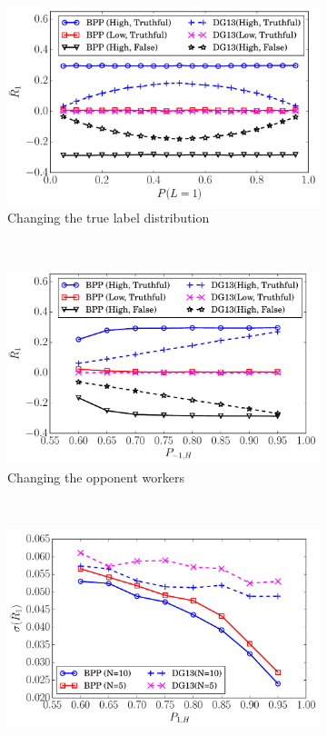 \documentclass{article}
\begin{document}
\begin{figure}[t]
    \centering
    \begin{subfigure}[t]{0.32\textwidth}
        \centering
        \includegraphics[width=\textwidth]{image/BPP1}
        \caption{\label{BPP1}Changing the true label distribution}
    \end{subfigure}%
    ~
    \begin{subfigure}[t]{0.32\textwidth}
        \centering
        \includegraphics[width=\textwidth]{image/BPP2}
        \caption{\label{BPP2}Changing the opponent workers}
    \end{subfigure}
        ~
    \begin{subfigure}[t]{0.32\textwidth}
        \centering
        \includegraphics[width=\textwidth]{image/BPP3}

\end{subfigure}
\end{figure}
\end{document}
